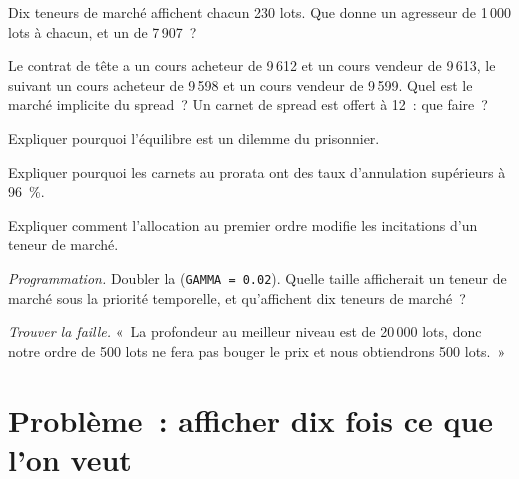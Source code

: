 \begin{exercise}[$\star$]\label{exo:hf:futures-market-making:2}
Dix teneurs de marché affichent chacun 230 lots. Que donne un agresseur de 1\,000 lots à chacun, et un de 7\,907~?
\end{exercise}

\begin{exercise}[$\star$]\label{exo:hf:futures-market-making:3}
Le contrat de tête a un cours acheteur de 9\,612 et un cours vendeur de 9\,613, le suivant un cours acheteur de 9\,598 et un cours vendeur de 9\,599. Quel est le marché implicite du spread~? Un carnet de spread est offert à
12~: que faire~?
\end{exercise}

\begin{exercise}[$\star\star$]\label{exo:hf:futures-market-making:4}
Expliquer pourquoi l'équilibre est un dilemme du prisonnier.
\end{exercise}

\begin{exercise}[$\star\star$]\label{exo:hf:futures-market-making:5}
Expliquer pourquoi les carnets au prorata ont des taux d'annulation supérieurs à 96~\%.
\end{exercise}

\begin{exercise}[$\star\star$]\label{exo:hf:futures-market-making:6}
Expliquer comment l'allocation au premier ordre modifie les incitations d'un teneur de marché.
\end{exercise}

\begin{exercise}[$\star\star\star$]\label{exo:hf:futures-market-making:7}
\emph{Programmation.} Doubler la  (\texttt{GAMMA = 0.02}). Quelle taille afficherait un teneur de marché sous la priorité temporelle, et qu'affichent dix teneurs de marché~?
\end{exercise}

\begin{exercise}[$\star\star\star$]\label{exo:hf:futures-market-making:8}
\emph{Trouver la faille.} «~La profondeur au meilleur niveau est de 20\,000 lots, donc notre ordre de 500 lots ne fera pas bouger le prix et nous obtiendrons 500 lots.~»
\end{exercise}

\section{Problème~: afficher dix fois ce que l'on veut}

